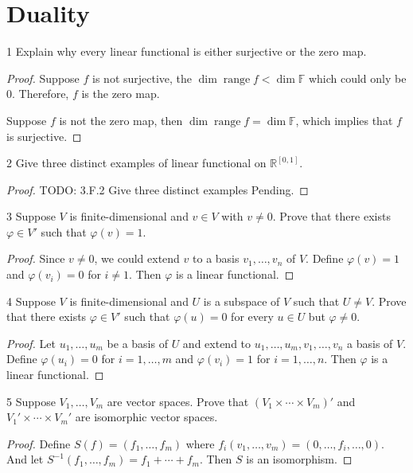 \documentclass{article}
\newenvironment{problem}[1]{\begin{prob*}{#1}{}}{\end{prob*}}
\DeclareMathOperator{\Range}{range}
\begin{document}
\section{Duality}

\begin{problem}{1}
Explain why every linear functional is either surjective or the zero map.
\end{problem}
\begin{proof}
Suppose $f$ is not surjective, the $\operatorname{dim} \Range f < \operatorname{dim} \mathbb{F}$ which could only be 0. Therefore, $f$ is the zero map. \par
Suppose $f$ is not the zero map, then $\operatorname{dim} \Range f = \operatorname{dim} \mathbb{F}$, which implies that $f$ is surjective.
\end{proof}

\begin{problem}{2}
Give three distinct examples of linear functional on $\mathbb{R}^{[0,1]}$.
\end{problem}
\begin{proof}
TODO: 3.F.2 Give three distinct examples Pending.
\end{proof}

\newpage
\begin{problem}{3}
Suppose $V $ is finite-dimensional and $v \in V$ with $v \neq 0.$ Prove that there exists $\varphi \in V'$ such that $\varphi(v) = 1$.
\end{problem}
\begin{proof}
Since $v \neq 0$, we could extend $v$ to a basis $v_1, \ldots ,v_n$ of $V$. Define $\varphi(v) = 1$ and $\varphi(v_i) = 0$ for $i \neq 1$. Then $\varphi$ is a linear functional.
\end{proof}

\begin{problem}{4}
Suppose $V $ is finite-dimensional and $U$ is a subspace of $V$ such that $U \neq V$. Prove that there exists $\varphi \in V'$ such that $\varphi(u) = 0$ for every $u \in U$ but $\varphi \neq 0$.
\end{problem}
\begin{proof}
Let $u_1, \ldots , u_m$ be a basis of $U$ and extend to $u_1, \ldots, u_m, v_1, \ldots , v_n$ a basis of $V$. Define $\varphi(u_i) = 0$ for $i = 1, \ldots , m$ and $\varphi(v_i) = 1$ for $i = 1, \ldots , n$. Then $\varphi$ is a linear functional.
\end{proof}

\begin{problem}{5}
Suppose $V_1 , \ldots , V_m$ are vector spaces. Prove that $(V_1 \times \cdots\times V_m)'$ and $V_1' \times  \cdots \times V_m'$ are isomorphic vector spaces.
\end{problem}
\begin{proof}
Define $S(f) = (f_1, \ldots , f_m)$ where $f_i(v_1, \ldots ,v_m) = (0, \ldots , f_i, \ldots ,0)$. And let $S^{-1} (f_1, \ldots ,f_m)= f_1 + \cdots + f_m$. Then $S$ is an isomorphism.
\end{proof}
\end{document}

